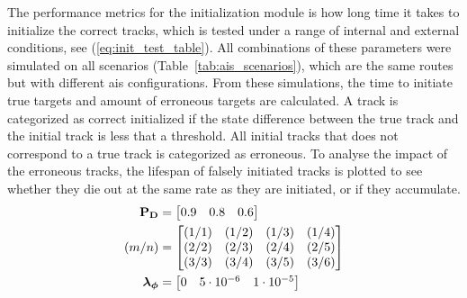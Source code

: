 The performance metrics for the initialization module is how long time it takes to initialize the correct tracks, which is tested under a range of internal and external conditions, see (\ref{eq:init_test_table}). All combinations of these parameters were simulated on all scenarios (Table~\ref{tab:ais_scenarios}), which are the same routes but with different \gls{ais} configurations. 
 From these simulations, the time to initiate true targets and amount of erroneous targets are calculated. A track is categorized as correct initialized if the state difference between the true track and the initial track is less that a threshold. All initial tracks that does not correspond to a true track is categorized as erroneous. To analyse the impact of the erroneous tracks, the lifespan of falsely initiated tracks is plotted to see whether they die out at the same rate as they are initiated, or if they accumulate.
\begin{equation}\label{eq:init_test_table}
\begin{split}
\boldsymbol{\mathbf{P_D}} &= \begin{bmatrix} 0.9 & 0.8 & 0.6 \end{bmatrix} \\
(m/n) &= \begin{bmatrix} 	(1/1) & (1/2) & (1/3) & (1/4) \\
							(2/2) & (2/3) & (2/4) & (2/5) \\
							(3/3) & (3/4) & (3/5) & (3/6)
		   \end{bmatrix} \\
\boldsymbol{\mathbf{\lambda_\phi}} &= \begin{bmatrix} 0 & 5\cdot10^{-6} & 1\cdot10^{-5}\end{bmatrix}
\end{split}
\end{equation}

